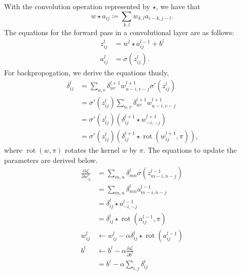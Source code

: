 \documentclass{IEEEtran}
\DeclareMathOperator{\rot}{rot}
\begin{document}
With the convolution operation represented by \(\star\), we have that
\[w\star a_{ij}\coloneqq \sum_{k,l} w_{k,l} a_{i - k,j - l}\text{.}\] The
equations for the forward pass in a convolutional layer are as follows:
\begin{align*}
    z_{ij}^{l} & = w^{l}\star a_{ij}^{l - 1} + b^{l} \\
    a_{ij}^{l} & = \sigma\left(z_{ij}^{l}\right)\text{.}
\end{align*}
For backpropogation, we derive the equations thusly,
\begin{align*}
    \delta_{ij}^{l} & = \sum_{u,v} \delta_{uv}^{l + 1} w_{u-i,v-j}^{l+1} \sigma'\left(z_{ij}^{l}\right) \\
     & = \sigma'\left(z_{ij}^{l}\right) \sum_{u,v} \delta_{uv}^{l+1} w_{u-i,v-j}^{l + 1} \\
     & = \sigma'\left(z_{ij}^{l}\right)\left(\delta_{ij}^{l+1}\star w_{-i,-j}^{l+1}\right) \\
     & = \sigma'\left(z_{ij}^{l}\right)\left(\delta_{ij}^{l+1}\star\rot\left(w_{ij}^{l+1}, \pi\right)\right)\text{,}
\end{align*}
where \(\rot(w,\pi)\) rotates the kernel \(w\) by \(\pi\). The equations to
update the parameters are derived below.
\begin{align*}
    \frac{\partial\mathcal{L}}{\partial w_{ij}^{l}} & = \sum_{m,n} \delta_{mn}^{l} \sigma\left(z_{m-i,n-j}^{l - 1}\right) \\
     & = \sum_{m,n} \delta_{mn}^{l} a_{m-i,n-j}^{l - 1} \\
     & = \delta_{ij}^{l}\star a_{-i,-j}^{l - 1} \\
     & = \delta_{ij}^{l}\star\rot\left(a_{ij}^{l - 1}, \pi\right) \\
    w_{ij}^{l} & \leftarrow w_{ij}^{l} - \alpha \delta_{ij}^{l}\star\rot\left(a_{ij}^{l - 1}\right) \\
    b^{l} & \leftarrow b^{l} - \alpha \frac{\partial\mathcal{L}}{\partial b^{l}} \\
     & = b^{l} - \alpha \sum_{i,j} \delta_{ij}^{l}
\end{align*}
\end{document}
